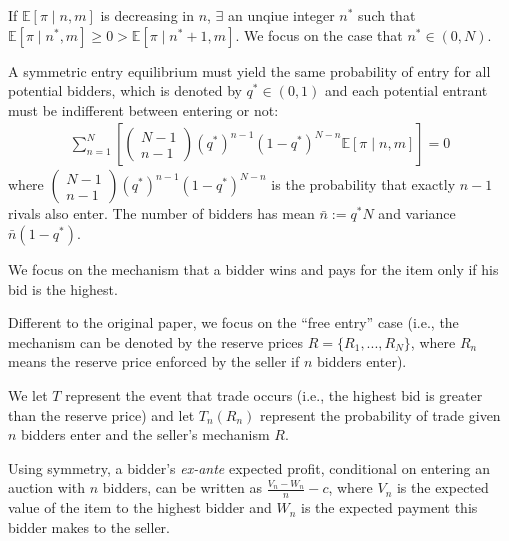 \documentclass[11pt]{elegantbook}
\begin{document}
If $\mathbb{E}[\pi\mid n,m]$ is decreasing in $n$, $\exists$ an unqiue integer $n^*$ such that $\mathbb{E}[\pi\mid n^*,m]\geq 0>\mathbb{E}[\pi\mid n^*+1,m]$. We focus on the case that $n^*\in (0,N)$.

A symmetric entry equilibrium must yield the same probability of entry for all potential bidders, which is denoted by $q^*\in (0,1)$ and each potential entrant must be indifferent between entering or not:
\begin{equation}
    \begin{aligned}
        \sum_{n=1}^N\left[
            \begin{pmatrix}
            N-1\\
            n-1
        \end{pmatrix}
        (q^*)^{n-1}(1-q^*)^{N-n}\mathbb{E}[\pi\mid n,m]
        \right]=0
    \end{aligned}
    \label{EAE_1}
\end{equation}
where $\begin{pmatrix}N-1\\n-1\end{pmatrix}(q^*)^{n-1}(1-q^*)^{N-n}$ is the probability that exactly $n-1$ rivals also enter. The number of bidders has mean $\bar{n}:=q^*N$ and variance $\bar{n}(1-q^*)$.

We focus on the mechanism that a bidder wins and pays for the item only if his bid is the highest.
\begin{note}
    Different to the original paper, we focus on the ``free entry'' case (i.e., the mechanism can be denoted by the reserve prices $R=\{R_1,...,R_N\}$, where $R_n$ means the reserve price enforced by the seller if $n$ bidders enter).
\end{note}
We let $T$ represent the event that trade occurs (i.e., the highest bid is greater than the reserve price) and let $T_n(R_n)$ represent the probability of trade given $n$ bidders enter and the seller's mechanism $R$.

Using symmetry, a bidder's \textit{ex-ante} expected profit, conditional on entering an auction with $n$ bidders, can be written as $\frac{V_n-W_n}{n}-c$, where $V_n$ is the expected value of the item to the highest bidder and $W_n$ is the expected payment this bidder makes to the seller.
\end{document}
